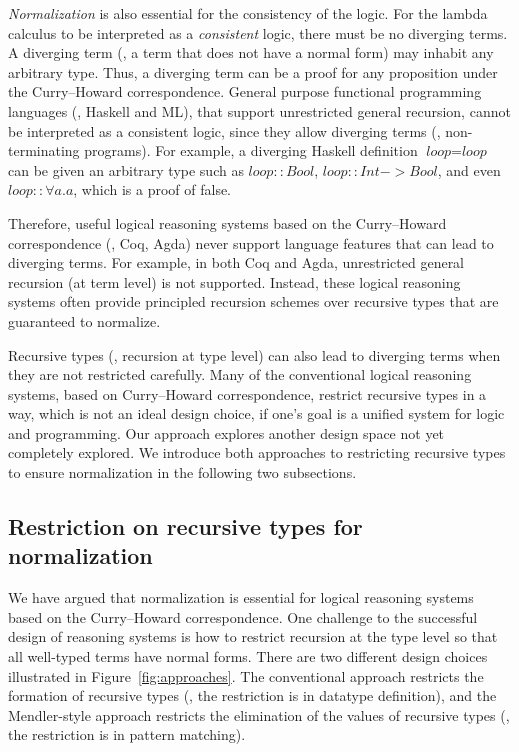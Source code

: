 \emph{Normalization} is also essential for the consistency of the logic.
For the lambda calculus to be interpreted as a \emph{consistent} logic,
there must be no diverging terms. A diverging term (\ie, a term that does
not have a normal form) may inhabit any arbitrary type. Thus, a diverging term
can be a proof for any proposition under the Curry--Howard correspondence.
General purpose functional programming languages (\eg, Haskell and ML), that
support unrestricted general recursion, cannot be interpreted as a consistent
logic, since they allow diverging terms (\ie, non-terminating programs).
For example, a diverging Haskell definition $\textit{loop} = \textit{loop}$
can be given an arbitrary type such as
$\textit{loop}\mathrel{::}\textit{Bool}$,
$\textit{loop}\mathrel{::}\textit{Int} -> \textit{Bool}$,
and even $\textit{loop}\mathrel{::}\forall a. a$, which is a proof of false.


Therefore, useful logical reasoning systems based on the Curry--Howard
correspondence (\eg, Coq, Agda) never support language features that can
lead to diverging terms. For example, in both Coq and Agda,
unrestricted general recursion (at term level) is not supported. 
Instead, these logical reasoning systems
often provide principled recursion schemes over recursive types that are
guaranteed to normalize. 

Recursive types (\ie, recursion at type level)
can also lead to diverging terms when they are not restricted carefully.
Many of the conventional logical reasoning systems, based on
Curry--Howard correspondence, restrict recursive types in a way,
which is not an ideal design choice, if one's goal is a unified system for
logic and programming. Our approach explores another design space not yet
completely explored. We introduce both approaches to restricting recursive
types to ensure normalization in the following two subsections.


\subsection{Restriction on recursive types for normalization}
\label{APP:sec:intro:concpets:recursive}
We have argued that normalization is essential for logical reasoning systems
based on the Curry--Howard correspondence. One challenge to the successful
design of reasoning systems is how to restrict recursion at the type level
so that all well-typed terms have normal forms. There are two different
design choices illustrated in Figure~\ref{fig:approaches}. 
The conventional approach restricts the formation of recursive types
(\ie, the restriction is in datatype definition), and
the Mendler-style approach restricts the elimination of the values of
recursive types (\ie, the restriction is in pattern matching).

